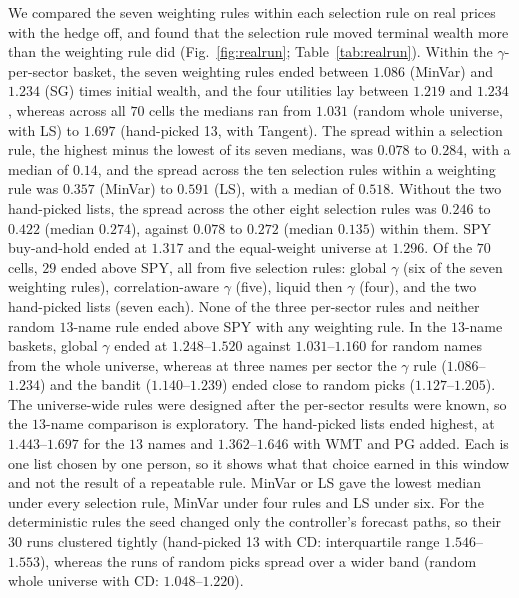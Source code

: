We compared the seven weighting rules within each selection rule on real prices with the hedge off, and found that
the selection rule moved terminal wealth more than the weighting rule did (Fig.~\ref{fig:realrun};
Table~\ref{tab:realrun}). Within the $\gamma$-per-sector basket, the seven weighting rules ended between $1.086$
(MinVar) and $1.234$ (SG) times initial wealth, and the four utilities lay between $1.219$ and $1.234$, whereas
across all $70$ cells the medians ran from $1.031$ (random whole universe, with LS) to $1.697$ (hand-picked 13, with
Tangent).
The spread within a selection rule, the highest minus the lowest of its seven medians, was $0.078$ to $0.284$, with
a median of $0.14$, and the spread across the ten selection rules within a weighting rule was $0.357$ (MinVar) to
$0.591$ (LS), with a median of $0.518$. Without the two hand-picked lists, the spread across the other eight
selection rules was $0.246$ to $0.422$ (median $0.274$), against $0.078$ to $0.272$ (median $0.135$) within them.
SPY buy-and-hold ended at $1.317$ and the equal-weight universe at $1.296$. Of the $70$ cells, $29$ ended above SPY,
all from five selection rules: global $\gamma$ (six of the seven weighting rules), correlation-aware $\gamma$ (five),
liquid then $\gamma$ (four), and the two hand-picked lists (seven each). None of the three per-sector rules and
neither random $13$-name rule ended above SPY with any weighting rule.
In the $13$-name baskets, global $\gamma$ ended at $1.248$--$1.520$ against $1.031$--$1.160$ for random names from
the whole universe, whereas at three names per sector the $\gamma$ rule ($1.086$--$1.234$) and the bandit
($1.140$--$1.239$) ended close to random picks ($1.127$--$1.205$). The universe-wide rules were designed after the
per-sector results were known, so the $13$-name comparison is exploratory. The hand-picked lists ended highest, at
$1.443$--$1.697$ for the $13$ names and $1.362$--$1.646$ with WMT and PG added. Each is one list chosen by one person,
so it shows what that choice earned in this window and not the result of a repeatable rule.
MinVar or LS gave the lowest median under every selection rule, MinVar under four rules and LS under six.
For the deterministic rules the seed changed only the controller's forecast paths, so their $30$ runs clustered
tightly (hand-picked 13 with CD: interquartile range $1.546$--$1.553$), whereas the runs of random picks spread over
a wider band (random whole universe with CD: $1.048$--$1.220$).

